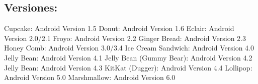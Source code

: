 \documentclass{bmcart}
\begin{document}
\subsection*{Versiones:}
Cupcake: Android Version 1.5\newline
Donut: Android Version 1.6 \newline
Eclair: Android Version 2.0/2.1 \newline
Froyo: Android Version 2.2\newline
Ginger Bread: Android Version 2.3 \newline
Honey Comb: Android Version 3.0/3.4\newline
Ice Cream Sandwich: Android Version 4.0 \newline
Jelly Bean: Android Version 4.1 \newline
Jelly Bean (Gummy Bear): Android Version 4.2 \newline
Jelly Bean: Android Version 4.3 \newline
KitKat (Dugger): Android Version 4.4 \newline
Lollipop: Android Version 5.0\newline
Marshmallow: Android Version 6.0


\newpage

\end{document}
